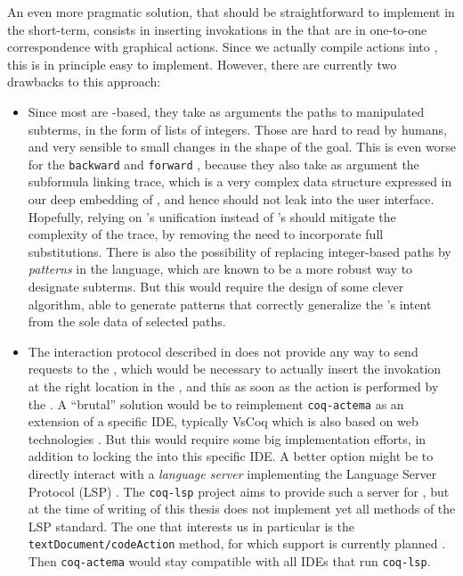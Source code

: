 An even more pragmatic solution, that should be straightforward to implement in
the short-term, consists in inserting  invokations in the 
that are in one-to-one correspondence with graphical actions. Since we actually
compile actions into , this is in principle easy to implement. However,
there are currently two drawbacks to this approach:
\begin{itemize}
  \item Since most  are -based, they take as arguments the
  paths to manipulated subterms, in the form of lists of integers. Those are
  hard to read by humans, and very sensible to small changes in the shape of the
  goal. This is even worse for the \texttt{backward} and \texttt{forward}
  , because they also take as argument the subformula linking trace,
  which is a very complex data structure expressed in our deep embedding of
  , and hence should not leak into the user interface.
  Hopefully, relying on 's unification instead of 's should mitigate
  the complexity of the trace, by removing the need to incorporate full
  substitutions. There is also the possibility of replacing integer-based paths
  by \emph{patterns} in the {\ssreflect} language, which are known to be a more
  robust way to designate subterms. But this would require the design of some
  clever algorithm, able to generate patterns that correctly generalize the
  's intent from the sole data of selected paths.

  \item The interaction protocol described in  does not provide
  any way to send requests to the , which would be necessary to
  actually insert the  invokation at the right location in the , and this as soon as the action is performed by the . A
  ``brutal'' solution would be to reimplement \texttt{coq-actema} as an
  extension of a specific IDE, typically VsCoq which is also based on web
  technologies \cite{VsCoq}. But this would require some big implementation
  efforts, in addition to locking the  into this specific IDE. A
  better option might be to directly interact with a \emph{language server}
  implementing the Language Server Protocol (LSP) \cite{LSP}. The
  \texttt{coq-lsp} project aims to provide such a server for , but at the
  time of writing of this thesis does not implement yet all methods of the LSP
  standard. The one that interests us in particular is the
  \texttt{textDocument/codeAction} method, for which support is currently
  planned \cite{coq-lsp-proto}. Then \texttt{coq-actema} would stay compatible
  with all IDEs that run \texttt{coq-lsp}.
\end{itemize}